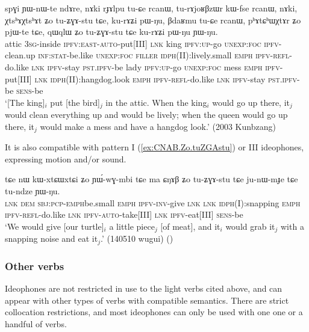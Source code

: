  
\begin{exe}
\ex \label{ex:XtshAXtshAt.Zo.tuZGAstu}
\gll spɣi ɲɯ-nɯ-te ndɤre, nɤki rɟɤlpu tu-ɕe rcanɯ, tu-rɤjoʁβzɯr kɯ-fse rcanɯ, nɤki, χtsʰɤχtsʰɤt ʑo tu-ʑɣɤ-stu tɕe, ku-rɤʑi pɯ-ŋu, βdaʁmu tu-ɕe rcanɯ, pʰɤtɕʰɯχtɤr ʑo pjɯ-te tɕe, qɯqlɯ ʑo tu-ʑɣɤ-stu tɕe ku-rɤʑi pɯ-ŋu ɲɯ-ŋu. 	\\
attic \textsc{3sg}-inside \textsc{ipfv}:\textsc{east}-\textsc{auto}-put[III] \textsc{lnk} king  \textsc{ipfv}:\textsc{up}-go \textsc{unexp}:\textsc{foc} \textsc{ipfv}-clean.up \textsc{inf}:\textsc{stat}-be.like  \textsc{unexp}:\textsc{foc} \textsc{filler}  \textsc{idph}(II):lively.small \textsc{emph} \textsc{ipfv}-\textsc{refl}-do.like \textsc{lnk} \textsc{ipfv}-stay \textsc{pst}.\textsc{ipfv}-be  lady  \textsc{ipfv}:\textsc{up}-go  \textsc{unexp}:\textsc{foc} mess \textsc{emph} \textsc{ipfv}-put[III] \textsc{lnk} \textsc{idph}(II):hangdog.look \textsc{emph} \textsc{ipfv}-\textsc{refl}-do.like \textsc{lnk} \textsc{ipfv}-stay \textsc{pst}.\textsc{ipfv}-be \textsc{sens}-be \\
\glt `[The king]$_i$ put [the bird]$_j$ in the attic. When the king$_i$  would go up there, it$_j$ would clean everything up and would be lively; when the queen would go up there, it$_j$ would make a mess and have a hangdog look.' (2003 Kunbzang)
\end{exe}

It is also compatible with pattern I (\ref{ex:CNAB.Zo.tuZGAstu}) or III ideophones, expressing motion and/or sound.

\begin{exe}
\ex \label{ex:CNAB.Zo.tuZGAstu}
\gll tɕe nɯ kɯ-xtɕɯ\redp{}xtɕi ʑo ɲɯ́-wɣ-mbi tɕe ma ɕŋɤβ ʑo tu-ʑɣɤ-stu tɕe ju-nɯ-mɟe tɕe tu-ndze ɲɯ-ŋu. \\
\textsc{lnk} \textsc{dem} \textsc{sbj}:\textsc{pcp}-\textsc{emph}\redp{}be.small \textsc{emph} \textsc{ipfv}-\textsc{inv}-give \textsc{lnk} \textsc{lnk} \textsc{idph}(I):snapping \textsc{emph} \textsc{ipfv}-\textsc{refl}-do.like \textsc{lnk} \textsc{ipfv}-\textsc{auto}-take[III] \textsc{lnk} \textsc{ipfv}-eat[III] \textsc{sens}-be \\
\glt `We would give [our turtle]$_i$ a little piece$_j$ [of meat], and it$_i$ would grab it$_j$ with a snapping noise and eat it$_j$.' (140510 wugui)
()
\end{exe}

\subsubsection{Other verbs} \label{sec:ideophone.plus.lexical.verb}
Ideophones are not restricted in use to the light verbs cited above, and can appear with other types of verbs with compatible semantics. There are strict collocation restrictions, and most ideophones can only be used with one one or a handful of verbs. 

